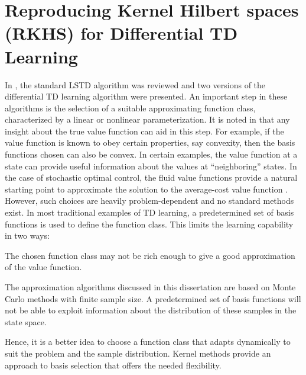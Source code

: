 \chapter{Reproducing Kernel Hilbert spaces (RKHS) for Differential TD Learning}
\label{ch:rkhs}
In , the standard LSTD algorithm was reviewed and two versions of the differential TD learning algorithm were presented. An important step in these algorithms is the selection of a suitable approximating function class, characterized by  a linear or nonlinear parameterization. It is noted in \cite{ctcn} that any insight about the true value function can aid in this step. For example, if the value function is known to obey certain properties, say convexity, then the basis functions chosen can also be convex.  In certain examples, the value function at a state can provide useful information about the values at ``neighboring'' states. In the case of stochastic optimal control, the fluid value functions provide a natural starting point to approximate the solution to the average-cost value function \cite{ctcn,huachemehmeysur11}. However, such choices are heavily problem-dependent and no standard methods exist. In most traditional examples of TD learning, a predetermined set of basis functions is used to define the function class. This limits the learning capability in two ways:
\begin{romannum}
	\item The chosen function class may not be rich enough to give a good approximation of the value function.
	\item The approximation algorithms discussed in this dissertation are based on Monte Carlo methods with finite sample size. A predetermined set of basis functions will not be able to exploit information about the distribution of these samples in the state space.  
\end{romannum}
Hence, it is a better idea to choose a function class that adapts dynamically to suit the problem and the sample distribution. Kernel methods provide an approach to basis selection that offers the needed flexibility. 

